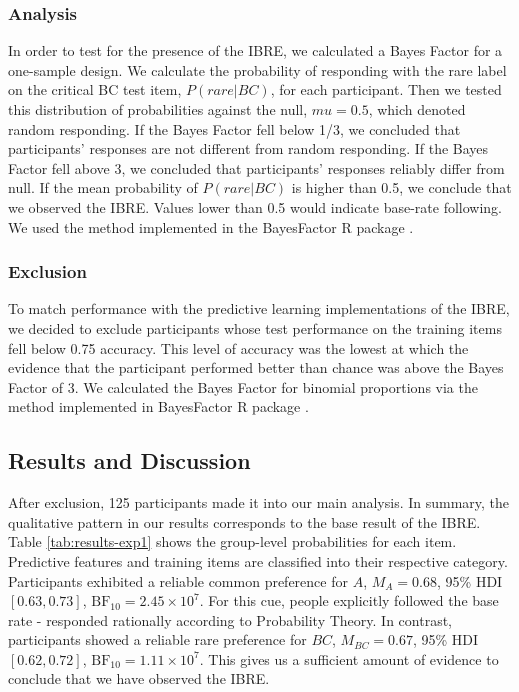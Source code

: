 \documentclass[10pt,letterpaper]{article}
\begin{document}
\subsubsection{Analysis}

In order to test for the presence of the IBRE, we calculated a Bayes Factor for a one-sample design.
We calculate the probability of responding with the rare label on the critical BC test item, $P(rare|BC)$, for each participant.
Then we tested this distribution of probabilities against the null, $mu = 0.5$, which denoted random responding.
If the Bayes Factor fell below 1/3, we concluded that participants' responses are not different from random responding.
If the Bayes Factor fell above 3, we concluded that participants' responses reliably differ from null.
If the mean probability of $P(rare|BC)$ is higher than 0.5, we conclude that we observed the IBRE.
Values lower than 0.5 would indicate base-rate following.
We used the method implemented in the BayesFactor R package \cite{morey2022bayes}.

\subsubsection{Exclusion}

To match performance with the predictive learning implementations of the IBRE, we decided to exclude participants whose test performance on the training items fell below 0.75 accuracy.
This level of accuracy was the lowest at which the evidence that the participant performed better than chance was above the Bayes Factor of 3.
We calculated the Bayes Factor for binomial proportions via the method implemented in BayesFactor R package \cite{morey2022bayes}.

\subsection{Results and Discussion}

After exclusion, 125 participants made it into our main analysis.
In summary, the qualitative pattern in our results corresponds to the base result of the IBRE.
Table \ref*{tab:results-exp1} shows the group-level probabilities for each item.
Predictive features and training items are classified into their respective category.
Participants exhibited a reliable common preference for $A$, $M_{A} = 0.68$, 95\% HDI $[0.63, 0.73]$, $\mathrm{BF}_{10} = 2.45 \times 10^{7}$.
For this cue, people explicitly followed the base rate - responded rationally according to Probability Theory.
In contrast, participants showed a reliable rare preference for $BC$, $M_{BC} = 0.67$, 95\% HDI $[0.62, 0.72]$, $\mathrm{BF}_{10} = 1.11 \times 10^{7}$.
This gives us a sufficient amount of evidence to conclude that we have observed the IBRE.
\end{document}
